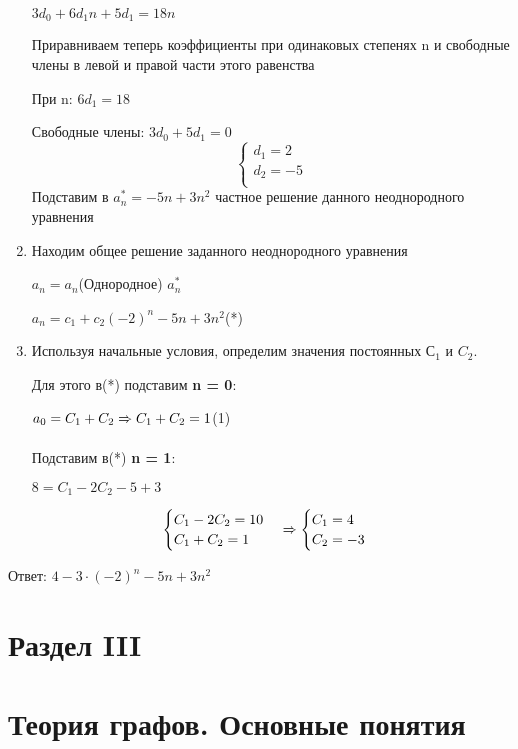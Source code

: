 \documentclass[12pt, a4paper, oneside]{article}
\theoremstyle{plain} %
\theoremstyle{definition}
\begin{document}
\begin{enumerate}
$3 d_0 + 6 d_1 n + 5 d_1 = 18 n $

Приравниваем теперь коэффициенты при одинаковых степенях n и свободные члены в левой и правой части этого равенства 

При n: $6 d_1 = 18$

Свободные члены: $3 d_0 + 5 d_1 = 0$
\[
\begin{cases}
   
    d_1 = 2\\
    
    d_2 = -5\\
    
\end{cases}
\]
Подставим в $a_n^* = - 5n + 3 n^2$ частное решение данного неоднородного уравнения 

\item Находим общее решение заданного неоднородного уравнения 

$a_n = a_n$(Однородное) $a_n^* $

$a_n = c_1 + c_2 (-2)^n - 5n + 3 n^2$(*)

\item Используя начальные условия, определим значения постоянных $С_1$  и $C_2$.

Для этого в(*) подставим \textbf{n = 0}:

$a_0 = C_1 + C_2 \xRightarrow[]{} C_1 + C_2 = 1$(1)

Подставим в(*) \textbf{n = 1}:

$8= C_1 - 2 C_2 -5 + 3$

\[
\begin{cases}
    C_1 - 2 C_2 = 10\\
    
    C_1 + C_2 = 1\\
\end{cases}
\xRightarrow[]{}
\begin{cases}
    C_1 = 4\\
    
    C_2 = -3\\
    
\end{cases}
\]
\end{enumerate}

Ответ: $4 - 3 \cdot (-2)^n - 5n + 3 n^2$

\section*{\textbf{Раздел III}}

\section{Теория графов. Основные понятия} 
\end{document}
